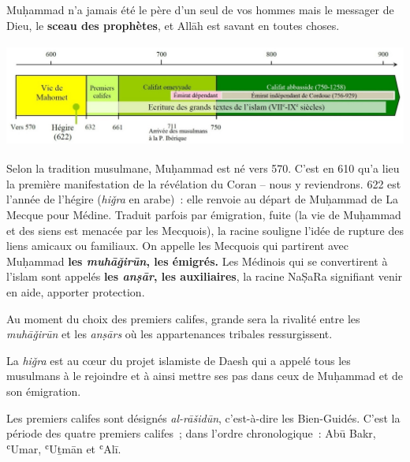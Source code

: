 {Muḥammad n'a jamais été le père d'un seul de vos hommes mais le messager
de Dieu, le \textbf{sceau des prophètes}, et Allāh est savant en toutes
choses.

\textbf{}


\includegraphics[width=5.51181in,height=1.34861in]{Images/image035.jpg}

Selon la tradition musulmane, Muḥammad est né vers 570. C'est en 610
qu'a lieu la première manifestation de la révélation du Coran -- nous y
reviendrons. 622 est l'année de l'hégire (\emph{hiǧra} en arabe)~: elle
renvoie au départ de Muḥammad de La Mecque pour Médine. Traduit parfois
par émigration, fuite (la vie de Muḥammad et des siens est menacée par
les Mecquois), la racine souligne l'idée de rupture des liens amicaux ou
familiaux. On appelle les Mecquois qui partirent avec Muḥammad
\textbf{les \emph{muhāǧirūn}, les émigrés.} Les Médinois qui se
convertirent à l'islam sont appelés \textbf{les \emph{anṣār}, les
auxiliaires}, la racine NaṢaRa signifiant venir en aide, apporter
protection.

Au moment du choix des premiers califes, grande sera la rivalité entre
les \emph{muhāǧirūn} et les \emph{anṣārs} où les appartenances tribales
ressurgissent.

La \emph{hiǧra} est au cœur du projet islamiste de Daesh qui a appelé
tous les musulmans à le rejoindre et à ainsi mettre ses pas dans ceux de
Muḥammad et de son émigration.

Les premiers califes sont désignés \emph{al-rāšidūn}, c'est-à-dire les
Bien-Guidés. C'est la période des quatre premiers califes~; dans l'ordre
chronologique~: Abū Bakr, ʿUmar, ʿUṯmān et ʿAlī.

}
